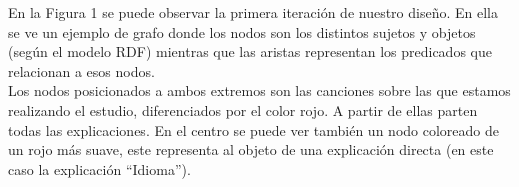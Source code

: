 En la Figura 1 se puede observar la primera iteración de nuestro diseño. En ella se ve un ejemplo de grafo donde los nodos son los distintos sujetos y objetos (según el modelo RDF) mientras que las aristas representan los predicados que relacionan a esos nodos.\\

Los nodos posicionados a ambos extremos son las canciones sobre las que estamos realizando el estudio, diferenciados por el color rojo. A partir de ellas parten todas las explicaciones. En el centro se puede ver también un nodo coloreado de un rojo más suave, este representa al objeto de una explicación directa (en este caso la explicación ``Idioma'').